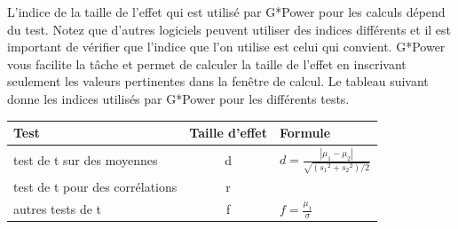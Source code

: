 \documentclass[
  12pt,
]{book}
\begin{document}
L'indice de la taille de l'effet qui est utilisé par G*Power pour les calculs dépend du test.
Notez que d'autres logiciels peuvent utiliser des indices différents et il est important de vérifier que l'indice que l'on utilise est celui qui convient.
G*Power vous facilite la tâche et permet de calculer la taille de l'effet en inscrivant seulement les valeurs pertinentes dans la fenêtre de calcul.
Le tableau suivant donne les indices utilisés par G*Power pour les différents tests.

\begin{longtable}[]{@{}lcl@{}}
\toprule
\begin{minipage}[b]{0.11\columnwidth}\raggedright
Test\strut
\end{minipage} & \begin{minipage}[b]{0.35\columnwidth}\centering
Taille d'effet\strut
\end{minipage} & \begin{minipage}[b]{0.46\columnwidth}\raggedright
Formule\strut
\end{minipage}\tabularnewline
\midrule
\endhead
\begin{minipage}[t]{0.11\columnwidth}\raggedright
test de t sur des moyennes\strut
\end{minipage} & \begin{minipage}[t]{0.35\columnwidth}\centering
d\strut
\end{minipage} & \begin{minipage}[t]{0.46\columnwidth}\raggedright
\(d = \frac{|\mu_1 - \mu_2|}{\sqrt{({s_1}^2 + {s_2}^2)/2}}\)\strut
\end{minipage}\tabularnewline
\begin{minipage}[t]{0.11\columnwidth}\raggedright
test de t pour des corrélations\strut
\end{minipage} & \begin{minipage}[t]{0.35\columnwidth}\centering
r\strut
\end{minipage} & \begin{minipage}[t]{0.46\columnwidth}\raggedright
\strut
\end{minipage}\tabularnewline
\begin{minipage}[t]{0.11\columnwidth}\raggedright
autres tests de t\strut
\end{minipage} & \begin{minipage}[t]{0.35\columnwidth}\centering
f\strut
\end{minipage} & \begin{minipage}[t]{0.46\columnwidth}\raggedright
\(f = \frac{\mu_1}{\sigma}\)\strut

\end{minipage}
\end{longtable}
\end{document}
